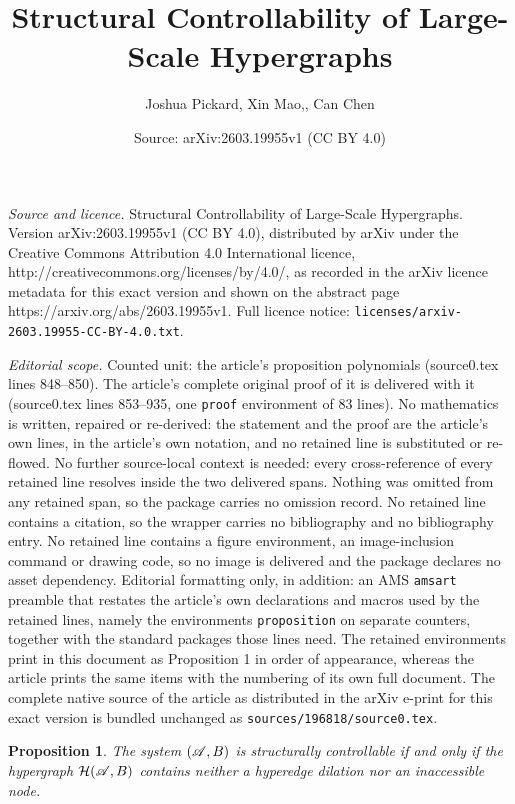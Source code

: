 \documentclass[10pt,a4paper]{amsart}
\title{\fontsize{22}{20}\selectfont Structural Controllability of Large-Scale Hypergraphs}
\author{Joshua Pickard, Xin Mao,, Can Chen}
\date{Source: arXiv:2603.19955v1 (CC BY 4.0)}
\newtheorem{proposition}{Proposition}
\newcommand{\Hs}{\mathcal{H}}
\begin{document}
\maketitle

\noindent\emph{Source and licence.} \fontsize{22}{20}\selectfont Structural Controllability of Large-Scale Hypergraphs. Version arXiv:2603.19955v1 (CC BY 4.0), distributed by arXiv under the Creative Commons Attribution 4.0 International licence, http://creativecommons.org/licenses/by/4.0/, as recorded in the arXiv licence metadata for this exact version and shown on the abstract page https://arxiv.org/abs/2603.19955v1. Full licence notice: \texttt{licenses/arxiv-2603.19955-CC-BY-4.0.txt}.\par\smallskip

\noindent\textit{Editorial scope.} Counted unit: the article's proposition polynomials (source0.tex lines 848--850). The article's complete original proof of it is delivered with it (source0.tex lines 853--935, one \texttt{proof} environment of 83 lines). No mathematics is written, repaired or re-derived: the statement and the proof are the article's own lines, in the article's own notation, and no retained line is substituted or re-flowed.  No further source-local context is needed: every cross-reference of every retained line resolves inside the two delivered spans.  Nothing was omitted from any retained span, so the package carries no omission record.  No retained line contains a citation, so the wrapper carries no bibliography and no bibliography entry.  No retained line contains a figure environment, an image-inclusion command or drawing code, so no image is delivered and the package declares no asset dependency.  Editorial formatting only, in addition: an AMS \texttt{amsart} preamble that restates the article's own declarations and macros used by the retained lines, namely the environments \texttt{proposition} on separate counters, together with the standard packages those lines need.  The retained environments print in this document as Proposition 1 in order of appearance, whereas the article prints the same items with the numbering of its own full document.  The complete native source of the article as distributed in the arXiv e-print for this exact version is bundled unchanged as \texttt{sources/196818/source0.tex}.
\begin{proposition}\label{thm: structural control of polynomials}
   The system $(\mathscr A,\textbf B)$ is structurally controllable if and only if the hypergraph $\Hs(\mathscr A,\textbf B)$ contains neither a hyperedge dilation nor an inaccessible node.
\end{proposition}
\end{document}

